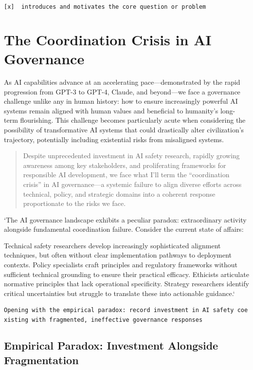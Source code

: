 \documentclass[
  11pt,
  letterpaper,
]{book}
\begin{document}
\texttt{{[}x{]}\ \ introduces\ and\ motivates\ the\ core\ question\ or\ problem}

\section{The Coordination Crisis in AI
Governance}\label{sec-coordination-crisis}

As AI capabilities advance at an accelerating pace---demonstrated by the
rapid progression from GPT-3 to GPT-4, Claude, and beyond---we face a
governance challenge unlike any in human history: how to ensure
increasingly powerful AI systems remain aligned with human values and
beneficial to humanity's long-term flourishing. This challenge becomes
particularly acute when considering the possibility of transformative AI
systems that could drastically alter civilization's trajectory,
potentially including existential risks from misaligned systems.

\begin{quote}
Despite unprecedented investment in AI safety research, rapidly growing
awareness among key stakeholders, and proliferating frameworks for
responsible AI development, we face what I'll term the ``coordination
crisis'' in AI governance---a systemic failure to align diverse efforts
across technical, policy, and strategic domains into a coherent response
proportionate to the risks we face.
\end{quote}

`The AI governance landscape exhibits a peculiar paradox: extraordinary
activity alongside fundamental coordination failure. Consider the
current state of affairs:

Technical safety researchers develop increasingly sophisticated
alignment techniques, but often without clear implementation pathways to
deployment contexts. Policy specialists craft principles and regulatory
frameworks without sufficient technical grounding to ensure their
practical efficacy. Ethicists articulate normative principles that lack
operational specificity. Strategy researchers identify critical
uncertainties but struggle to translate these into actionable guidance.`

\texttt{Opening\ with\ the\ empirical\ paradox:\ record\ investment\ in\ AI\ safety\ coexisting\ with\ fragmented,\ ineffective\ governance\ responses}

\subsection{Empirical Paradox: Investment Alongside
Fragmentation}\label{sec-empirical-paradox}
\end{document}

